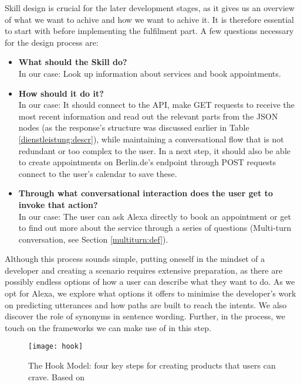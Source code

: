 Skill design is crucial for the later development stages, as it gives us an overview of what we want to achive and how we want to achive it. It is therefore essential to start with before implementing the fulfilment part. A few questions necessary for the design process are:
\begin{itemize}
\item \textbf{What should the Skill do?\\}
In our case: Look up information about services and book appointments.
\item  \textbf{How should it do it?\\}
In our case: It should connect to the API, make GET requests to receive the most recent information and read out the relevant parts from the JSON nodes (as the response's structure was discussed earlier in Table \ref{dienstleistung:descr}), while maintaining a conversational flow that is not redundant or too complex to the user. In a next step, it should also be able to create appointments on Berlin.de's endpoint through POST requests connect to the user's calendar to save these.

\item \textbf{Through what conversational interaction does the user get to invoke that action?}\\
In our case: The user can ask Alexa directly to book an appointment or get to find out more about the service through a series of questions (Multi-turn conversation, see Section \ref{multiturn:def}).

\end{itemize}


Although this process sounds simple, putting oneself in the mindset of a developer and creating a scenario requires extensive preparation, as there are possibly endless options of how a user can describe what they want to do. As we opt for Alexa, we explore what options it offers to minimise the developer's work on predicting utterances and how paths are built to reach the intents. We also discover the role of synonyms in sentence wording. Further, in the process, we touch on the frameworks we can make use of in this step.


	
	\begin{wrapfigure}{r}{0.48\textwidth}
		\caption[Hook Model Steps]{The Hook Model: four key steps for creating products that users can crave. Based on \cite{eyal:hook}}
		\label{hookeyal}
		\texttt{[image: hook]}
	\end{wrapfigure}

